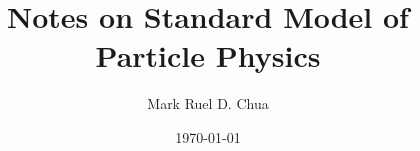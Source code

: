 \documentclass[b5paper,12pt]{book}
\begin{document}
\author{Mark Ruel D. Chua}
\title{Notes on Standard Model of Particle Physics}
\date{\today}

\frontmatter
\maketitle

\tableofcontents

\mainmatter





\backmatter
\end{document}
